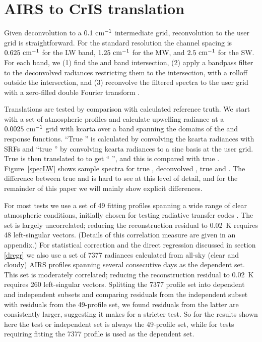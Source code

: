 \documentclass[10pt,twocolumn]{article}  %
\begin{document}
\FloatBarrier
\section{AIRS to CrIS translation}
\label{airs2cris}

Given {\airs} deconvolution to a $0.1~\mbox{cm$^{-1}$}$ intermediate grid,
reconvolution to the {\cris} user grid is straightforward.  For the
{\cris} standard resolution the channel spacing is $0.625~\mbox{cm$^{-1}$}$ for
the LW band, $1.25~\mbox{cm$^{-1}$}$ for the MW, and $2.5~\mbox{cm$^{-1}$}$ for the SW.  
For each {\cris} band, we (1) find the {\airs} and {\cris} band
intersection, (2) apply a bandpass filter to the deconvolved {\airs}
radiances restricting them to the intersection, with a rolloff
outside the intersection, and (3) reconvolve the filtered spectra to
the {\cris} user grid with a zero-filled double Fourier transform
\cite{git:finterp}.

Translations are tested by comparison with calculated reference
truth.  We start with a set of atmospheric profiles and calculate
upwelling radiance at a $0.0025~\mbox{cm$^{-1}$}$ grid with kcarta \cite{kcarta1}
over a band spanning the domains of the {\airs} and {\cris} response
functions.  ``True {\airs}'' is calculated by convolving the kcarta
radiances with {\airs} SRFs and ``true {\cris}'' by convolving
kcarta radiances to a sinc basis at the {\cris} user grid.  True
{\airs} is then translated to {\cris} to get ``{\airs} {\cris}'',
and this is compared with true {\cris}.  Figure~\ref{specLW} shows
sample spectra for true {\airs}, deconvolved {\airs}, true {\cris}
and {\airs} {\cris}.  The difference between true {\cris} and
{\airs} {\cris} is hard to see at this level of detail, and for the
remainder of this paper we will mainly show explicit differences.

For most tests we use a set of 49 fitting profiles spanning a wide
range of clear atmospheric conditions, initially chosen for testing
radiative transfer codes \cite{sarta1,sarta2}.  The set is largely
uncorrelated; reducing the reconstruction residual to 0.02~K
requires 48 left-singular vectors.  (Details of this correlation
measure are given in an appendix.)  For statistical correction and
the direct regression discussed in section \ref{dregr} we also use a
set of 7377 radiances calculated from all-sky (clear and cloudy)
AIRS profiles spanning several consecutive days as the dependent
set.  This set is moderately correlated; reducing the reconstruction
residual to 0.02~K requires 260 left-singular vectors.  Splitting
the 7377 profile set into dependent and independent subsets and
comparing residuals from the independent subset with residuals from
the 49-profile set, we found residuals from the latter are
consistently larger, suggesting it makes for a stricter test.  So
for the results shown here the test or independent set is always the
49-profile set, while for tests requiring fitting the 7377 profile
is used as the dependent set.
\end{document}
